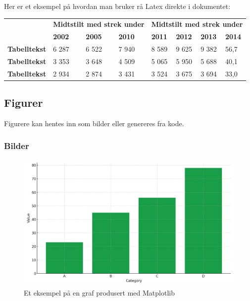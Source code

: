 \documentclass[
  10pt,
]{scrartcl}
\begin{document}
Her er et eksempel på hvordan man bruker rå Latex direkte i dokumentet:

\begin{table}[]
\begin{tabular}{llllllll}
\hline
 & \multicolumn{3}{l}{\textbf{Midtstilt   med strek under}} & \multicolumn{4}{l}{\textbf{Midtstilt   med strek under}}      \\ \cline{2-8} 
 & \textbf{2002}     & \textbf{2005}     & \textbf{2010}    & \textbf{2011} & \textbf{2012} & \textbf{2013} & \textbf{2014} \\ \hline
\textbf{Tabelltekst} & 6 287 & 6 522 & 7 940 & 8 589 & 9 625 & 9 382 & 56,7 \\
\textbf{Tabelltekst} & 3 353 & 3 648 & 4 509 & 5 065 & 5 950 & 5 688 & 40,1 \\
\textbf{Tabelltekst} & 2 934 & 2 874 & 3 431 & 3 524 & 3 675 & 3 694 & 33,0 \\ \hline
\end{tabular}
\end{table}

\subsection{Figurer}\label{figurer}

Figurere kan hentes inn som bilder eller genereres fra kode.

\subsubsection{Bilder}\label{bilder}

\begin{figure}

\caption{\label{fig-example1}Et eksempel på en graf produsert med
Matplotlib}

\includegraphics{./fig1.pdf}

\end{figure}%
\end{document}
